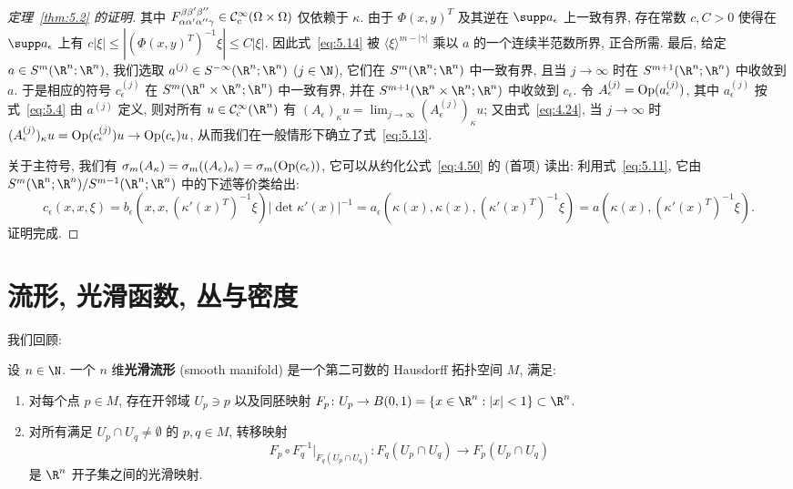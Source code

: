 \begin{proof}[定理~\ref{thm:5.2} 的证明]
其中 $F_{\alpha \alpha' \alpha'' \gamma}^{\beta \beta' \beta''} \in \mathcal{C}_{\mathrm{c}}^\infty(\Omega \times \Omega)$ 仅依赖于 $\kappa$. 由于 $\Phi(x, y)^T$ 及其逆在 $\supp a_\epsilon$ 上一致有界, 存在常数 $c, C > 0$ 使得在 $\supp a_\epsilon$ 上有 $c |\xi| \le |(\Phi(x, y)^T)^{-1} \xi| \le C |\xi|$. 因此式~\eqref{eq:5.14} 被 $\langle \xi \rangle^{m - |\gamma|}$ 乘以 $a$ 的一个连续半范数所界, 正合所需. 最后, 给定 $a \in S^m(\R^n; \R^n)$, 我们选取 $a^{(j)} \in S^{-\infty}(\R^n; \R^n)$ ($j \in \N$), 它们在 $S^m(\R^n; \R^n)$ 中一致有界, 且当 $j \to \infty$ 时在 $S^{m+1}(\R^n; \R^n)$ 中收敛到 $a$. 于是相应的符号 $c_\epsilon^{(j)}$ 在 $S^m(\R^n \times \R^n; \R^n)$ 中一致有界, 并在 $S^{m+1}(\R^n \times \R^n; \R^n)$ 中收敛到 $c_\epsilon$. 令 $A_\epsilon^{(j)} = \operatorname{Op}(a_\epsilon^{(j)})$, 其中 $a_\epsilon^{(j)}$ 按式~\eqref{eq:5.4} 由 $a^{(j)}$ 定义, 则对所有 $u \in \SmoothComp(\R^n)$ 有 $(A_\epsilon)_\kappa u = \lim_{j \to \infty} (A_\epsilon^{(j)})_\kappa u$; 又由式~\eqref{eq:4.24}, 当 $j \to \infty$ 时 $(A_\epsilon^{(j)})_\kappa u = \operatorname{Op}(c_\epsilon^{(j)}) u \to \operatorname{Op}(c_\epsilon) u$, 从而我们在一般情形下确立了式~\eqref{eq:5.13}.

关于主符号, 我们有 $\sigma_m(A_\kappa) = \sigma_m((A_\epsilon)_\kappa) = \sigma_m(\operatorname{Op}(c_\epsilon))$, 它可以从约化公式~\eqref{eq:4.50} 的 (首项) 读出: 利用式~\eqref{eq:5.11}, 它由 $S^m(\R^n; \R^n) / S^{m-1}(\R^n; \R^n)$ 中的下述等价类给出:
\[
    c_\epsilon(x, x, \xi) = b_\epsilon\left( x, x, (\kappa'(x)^T)^{-1} \xi \right) |\!\det \kappa'(x)|^{-1} = a_\epsilon\left( \kappa(x), \kappa(x), (\kappa'(x)^T)^{-1} \xi \right) = a\left( \kappa(x), (\kappa'(x)^T)^{-1} \xi \right).
\]
证明完成.
\end{proof}

\section{流形, 光滑函数, 丛与密度}\label{sec:5.2}
%
%
%

我们回顾:

\begin{definition}[光滑流形]\label{def:5.3}
设 $n \in \N$. 一个 $n$ 维\textbf{光滑流形} (smooth manifold) 是一个第二可数的 Hausdorff 拓扑空间 $M$, 满足:
\begin{enumerate}
    \item 对每个点 $p \in M$, 存在开邻域 $U_p \ni p$ 以及同胚映射 $F_p \colon U_p \to B(0, 1) = \{x \in \R^n : |x| < 1\} \subset \R^n$.
    \item 对所有满足 $U_p \cap U_q \neq \emptyset$ 的 $p, q \in M$, 转移映射
    \begin{equation}\label{eq:5.15}
        F_p \circ F_q^{-1}|_{F_q(U_p \cap U_q)} \colon F_q(U_p \cap U_q) \to F_p(U_p \cap U_q)
    \end{equation}
    是 $\R^n$ 开子集之间的光滑映射.
\end{enumerate}
\end{definition}

